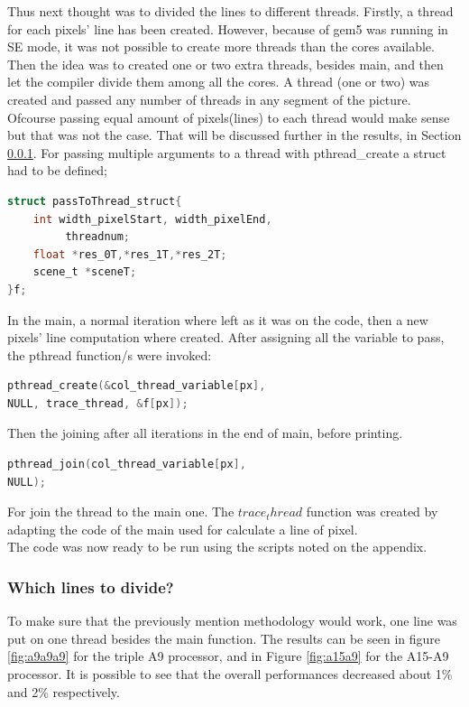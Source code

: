\documentclass[journal]{IEEEtran}
\begin{document}
Thus next thought was to divided the lines to different threads. Firstly, a thread for each pixels’ line has been created. However, because of gem5 was running in SE mode, it was not possible to create more threads than the cores available. Then the idea was to created one or two extra threads, besides main, and then let the compiler divide them among all the cores. A thread (one or two) was created and passed any number of threads in any segment of the picture. Ofcourse passing equal amount of pixels(lines) to each thread would make sense but that was not the case. That will be discussed further in the results, in Section \ref{sec:res}.
For passing multiple arguments to a thread with pthread\_create a struct had to be defined;
\begin{lstlisting}[language=C,caption={Struct for thread defined}]
struct passToThread_struct{
    int width_pixelStart, width_pixelEnd,
         threadnum;
    float *res_0T,*res_1T,*res_2T;
    scene_t *sceneT;
}f;
\end{lstlisting}
In the main, a normal iteration where left as it was on the code, then a new pixels' line computation where created. After assigning all the variable to pass, the pthread function/s were invoked:
\begin{lstlisting}[language=c,caption={Creating threads}]
pthread_create(&col_thread_variable[px],
NULL, trace_thread, &f[px]);
\end{lstlisting} 
Then the joining after all iterations in the end of main, before printing.  
\begin{lstlisting}[language=c,caption={Joining threads }]
pthread_join(col_thread_variable[px], 
NULL);
\end{lstlisting}
For join the thread to the main one.
The \(trace_thread\) function was created by adapting the code of the main used for calculate a line of pixel.\\

The code was now ready to be run using the scripts noted on the appendix.



\subsubsection{Which lines to divide?}
\label{sec:res}
To make sure that the previously mention methodology would work, one line was put on one thread besides the main function. The results can be seen in figure \ref{fig:a9a9a9} for the triple A9 processor, and in Figure \ref{fig:a15a9} for the A15-A9 processor. It is possible to see that the overall performances decreased about 1\% and 2\% respectively.
\end{document}
